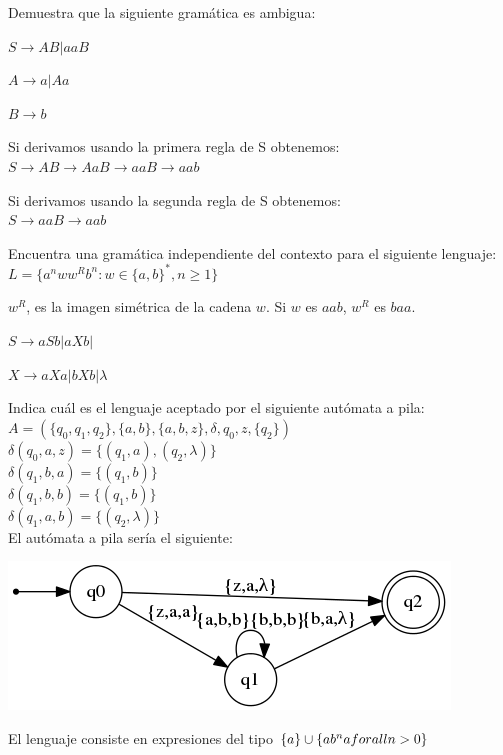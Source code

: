 \begin{problem}[4]
 Demuestra que la siguiente gramática es ambigua:
 
 $S \longrightarrow AB | aaB$
 
 $A \longrightarrow a|Aa$
 
 $B\longrightarrow b$
 
 
 \solution
 Si derivamos usando la primera regla de S obtenemos:\\
 $S \longrightarrow AB \longrightarrow AaB \longrightarrow aaB \longrightarrow aab $
 
  Si derivamos usando la segunda regla de S obtenemos:\\
  $S \longrightarrow aaB \longrightarrow aab$
 
 \end{problem}
  
  \begin{problem}[5]
  Encuentra una gramática independiente del contexto para el siguiente lenguaje:\\
  $L=\{a^nww^Rb^n:w\in\{a,b\}^*, n\geq1\}$
  
  \solution
  $w^R$, es la imagen simétrica de la cadena $w$. Si $w$ es $aab$, $w^R$ es $baa$.
  
   $S \longrightarrow aSb | aXb | $
   
   $X \longrightarrow aXa | bXb | \lambda$

  
  \end{problem}
  
  \begin{problem}[6]
  Indica cuál es el lenguaje aceptado por el siguiente autómata a pila:\\
  $A = (\{q_0,q_1,q_2\},\{a,b\},\{a,b,z\},\delta,q_0,z,\{q_2\})$\\
  $\delta(q_0,a,z) = \{(q_1,a),(q_2,\lambda)\} $\\
   $\delta(q_1,b,a) = \{(q_1,b)\} $\\
   $\delta(q_1,b,b) = \{(q_1,b)\} $\\
   $\delta(q_1,a,b) = \{(q_2,\lambda)\} $\\
  
  \solution
  El autómata a pila sería el siguiente:
  \begin{center}
    \includegraphics[scale=0.75]{tex/ejerciciosHoja1/automata_8.png}
   \end{center}
   El lenguaje consiste en expresiones del tipo $\{a\}\cup\{ab^n a\\forall n>0\}$
  
  \end{problem}

